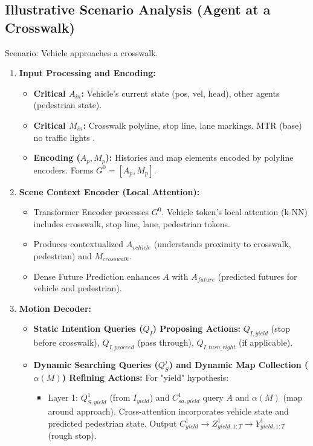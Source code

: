\subsection{Illustrative Scenario Analysis (Agent at a Crosswalk)}
\label{subsec:scenario_crosswalk}

Scenario: Vehicle approaches a crosswalk.

\begin{enumerate}
    \item \textbf{Input Processing and Encoding:}
    \begin{itemize}
        \item \textbf{Critical $A_{in}$:} Vehicle's current state (pos, vel, head), other agents (pedestrian state).
        \item \textbf{Critical $M_{in}$:} Crosswalk polyline, stop line, lane markings. MTR (base) no traffic lights \cite{Shi2022MTR_A}.
        \item \textbf{Encoding ($A_p, M_p$):} Histories and map elements encoded by polyline encoders. Forms $G^0 = [A_p, M_p]$.
    \end{itemize}
    \item \textbf{Scene Context Encoder (Local Attention):}
    \begin{itemize}
        \item Transformer Encoder processes $G^0$. Vehicle token's local attention (k-NN) includes crosswalk, stop line, lane, pedestrian tokens.
        \item Produces contextualized $A_{vehicle}$ (understands proximity to crosswalk, pedestrian) and $M_{crosswalk}$.
        \item Dense Future Prediction enhances $A$ with $A_{future}$ (predicted futures for vehicle and pedestrian).
    \end{itemize}
    \item \textbf{Motion Decoder:}
    \begin{itemize}
        \item \textbf{Static Intention Queries ($Q_I$) Proposing Actions:} $Q_{I,yield}$ (stop before crosswalk), $Q_{I,proceed}$ (pass through), $Q_{I,turn\_right}$ (if applicable).
        \item \textbf{Dynamic Searching Queries ($Q_S^j$) and Dynamic Map Collection ($\alpha(M)$) Refining Actions:}
        For "yield" hypothesis:
        \begin{itemize}
            \item Layer 1: $Q_{S,yield}^1$ (from $I_{yield}$) and $C_{sa,yield}^1$ query $A$ and $\alpha(M)$ (map around approach). Cross-attention incorporates vehicle state and predicted pedestrian state. Output $C_{yield}^1 \to Z_{yield,1:T}^1 \to Y_{yield,1:T}^1$ (rough stop).

\end{itemize}
\end{itemize}
\end{enumerate}
